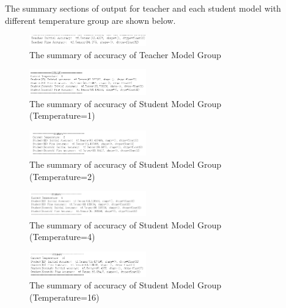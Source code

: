 \documentclass[conference]{IEEEtran}
\begin{document}
The summary sections of output for teacher and each student model with different temperature group are shown below.

\begin{figure}[hbtp] 
    \centering
    \includegraphics[width=0.45\textwidth]{./graphs/Task2/teacher_acc.png}
    \caption{The summary of accuracy of Teacher Model Group}
    \label{sum-te}
\end{figure}

\begin{figure}[hbtp] 
    \centering
    \includegraphics[width=0.45\textwidth]{./graphs/Task2/t1_acc.png}
    \caption{The summary of accuracy of Student Model Group (Temperature=1)}
    \label{sum-t1}
\end{figure}

\begin{figure}[hbtp] 
    \centering
    \includegraphics[width=0.45\textwidth]{./graphs/Task2/t2_acc.png}
    \caption{The summary of accuracy of Student Model Group (Temperature=2)}
    \label{sum-t2}
\end{figure}

\begin{figure}[hbtp] 
    \centering
    \includegraphics[width=0.45\textwidth]{./graphs/Task2/t4_acc.png}
    \caption{The summary of accuracy of Student Model Group (Temperature=4)}
    \label{sum-t4}
\end{figure}

\begin{figure}[hbtp] 
    \centering
    \includegraphics[width=0.45\textwidth]{./graphs/Task2/t16_acc.png}
    \caption{The summary of accuracy of Student Model Group (Temperature=16)}
    \label{sum-t16}
\end{figure}
\end{document}

